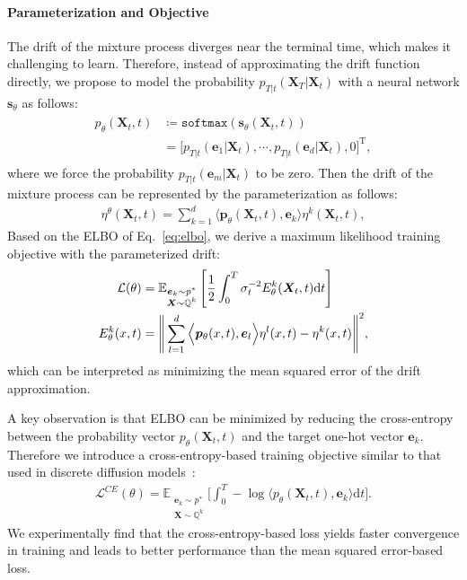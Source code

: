 \paragraph{Parameterization and Objective}
The drift of the mixture process diverges near the terminal time, which makes it challenging to learn. 
Therefore, instead of approximating the drift function directly, we propose to model the probability $p_{T|t}(\bm{X}_T|\bm{X}_t)$ with a neural network $\bm{s}_{\theta}$ as follows:
\begin{align}
\begin{split}
    p_{\theta}(\bm{X}_t,t) 
    &\coloneqq\texttt{softmax}\left( \bm{s}_{\theta}(\bm{X}_t,t) \right) \\
    &= \Big[ p_{T|t}(\bm{e}_1|\bm{X}_t), \cdots, p_{T|t}(\bm{e}_d|\bm{X}_t), 0 \Big]^{\text{T}},
\end{split}
\label{eq:prob_parameterization}
\end{align}
where we force the probability $p_{T|t}(\bm{e}_m|\bm{X}_t)$ to be zero.
Then the drift of the mixture process can be represented by the parameterization as follows:
\begin{align}
    \eta^{\theta}(\bm{X}_t,t) 
    = \sum^{d}_{k=1} \Big\langle \bm{p}_{\theta}(\bm{X}_t,t), \bm{e}_k\Big\rangle \eta^{k}(\bm{X}_t,t),
\end{align}
Based on the ELBO of Eq.~\eqref{eq:elbo}, we derive a maximum likelihood training objective with the parameterized drift:
\begin{align}
    \mathcal{L}(\theta) &= \mathbb{E}_{\substack{\bm{e}_k\sim  p^{\ast} \\ \bm{X}\sim\mathbb{Q}^{k}}} \left[
    \frac{1}{2} \int^T_0 \sigma_t^{-2} E^k_{\theta}(\bm{X}_t,t) \mathrm{d}t \right] \label{eq:mixture_objective} \\
    E^k_{\theta}(x, t) &= \Bigg\| \sum^d_{l=1} \Big\langle\bm{p}_{\theta}(x,t), \bm{e}_l \Big\rangle \eta^l(x,t) - \eta^k(x,t) \Bigg\|^2, \notag
\end{align}
which can be interpreted as minimizing the mean squared error of the drift approximation.



A key observation is that ELBO can be minimized by reducing the cross-entropy between the probability vector $p_{\theta}(\bm{X}_t,t)$ and the target one-hot vector $\bm{e}_k$.
Therefore we introduce a cross-entropy-based training objective similar to that used in discrete diffusion models~\citep{sahoo2024simple,shi2024md4}:
\begin{align}
    \mathcal{L}^{CE}(\theta) = \mathbb{E}_{\substack{\bm{e}_k\sim  p^{\ast} \\ \bm{X}\sim\mathbb{Q}^{k}}}
    \bigg[ \int^T_0 \! -\log \big\langle p_{\theta}(\bm{X}_t,t), \bm{e}_k \big\rangle \mathrm{d}t \bigg].
\label{eq:ce_objective}
\end{align}
We experimentally find that the cross-entropy-based loss yields faster convergence in training and leads to better performance than the mean squared error-based loss.


